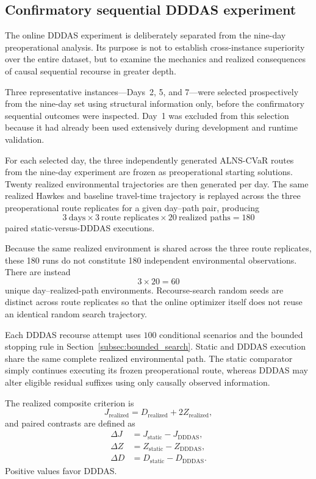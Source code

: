 \documentclass[preprint,12pt]{elsarticle}
\newcommand{\1}{\mathbf{1}}
\begin{document}
\subsection{Confirmatory sequential DDDAS experiment}
\label{subsec:r5h_design}

The online DDDAS experiment is deliberately separated from the nine-day
preoperational analysis. Its purpose is not to establish cross-instance
superiority over the entire dataset, but to examine the mechanics and
realized consequences of causal sequential recourse in greater depth.

Three representative instances---Days~2, 5, and 7---were selected
prospectively from the nine-day set using structural information only, before
the confirmatory sequential outcomes were inspected. Day~1 was excluded from
this selection because it had already been used extensively during development
and runtime validation.

For each selected day, the three independently generated ALNS-CVaR routes from
the nine-day experiment are frozen as preoperational starting solutions.
Twenty realized environmental trajectories are then generated per day.
The same realized Hawkes and baseline travel-time trajectory is replayed across
the three preoperational route replicates for a given day--path pair, producing
\[
3\ \text{days}
\times
3\ \text{route replicates}
\times
20\ \text{realized paths}
=
180
\]
paired static-versus-DDDAS executions.

Because the same realized environment is shared across the three route
replicates, these 180 runs do not constitute 180 independent environmental
observations. There are instead
\[
3\times20=60
\]
unique day--realized-path environments.
Recourse-search random seeds are distinct across route replicates so that the
online optimizer itself does not reuse an identical random search trajectory.

Each DDDAS recourse attempt uses $100$ conditional scenarios and the bounded
stopping rule in Section~\ref{subsec:bounded_search}.
Static and DDDAS execution share the same complete realized environmental path.
The static comparator simply continues executing its frozen preoperational route,
whereas DDDAS may alter eligible residual suffixes using only causally observed
information.

The realized composite criterion is
\begin{equation}
	J_{\mathrm{realized}}
	=
	D_{\mathrm{realized}}
	+
	2Z_{\mathrm{realized}},
\end{equation}
and paired contrasts are defined as
\begin{align}
	\Delta J
	&=
	J_{\mathrm{static}}
	-
	J_{\mathrm{DDDAS}},
	\\
	\Delta Z
	&=
	Z_{\mathrm{static}}
	-
	Z_{\mathrm{DDDAS}},
	\\
	\Delta D
	&=
	D_{\mathrm{static}}
	-
	D_{\mathrm{DDDAS}}.
\end{align}
Positive values favor DDDAS.
\end{document}
